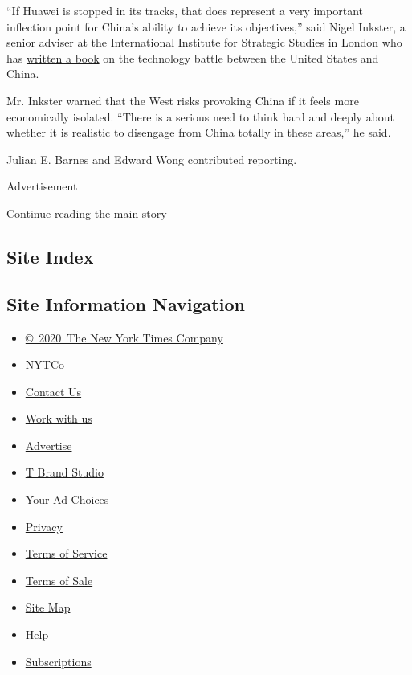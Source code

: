 ``If Huawei is stopped in its tracks, that does represent a very
important inflection point for China's ability to achieve its
objectives,'' said Nigel Inkster, a senior adviser at the International
Institute for Strategic Studies in London who has
\href{https://www.hurstpublishers.com/book/the-great-decoupling/}{written
a book} on the technology battle between the United States and China.

Mr. Inkster warned that the West risks provoking China if it feels more
economically isolated. ``There is a serious need to think hard and
deeply about whether it is realistic to disengage from China totally in
these areas,'' he said.

Julian E. Barnes and Edward Wong contributed reporting.

Advertisement

\protect\hyperlink{after-bottom}{Continue reading the main story}

\hypertarget{site-index}{%
\subsection{Site Index}\label{site-index}}

\hypertarget{site-information-navigation}{%
\subsection{Site Information
Navigation}\label{site-information-navigation}}

\begin{itemize}
\tightlist
\item
  \href{https://help.nytimes.com/hc/en-us/articles/115014792127-Copyright-notice}{©~2020~The
  New York Times Company}
\end{itemize}

\begin{itemize}
\tightlist
\item
  \href{https://www.nytco.com/}{NYTCo}
\item
  \href{https://help.nytimes.com/hc/en-us/articles/115015385887-Contact-Us}{Contact
  Us}
\item
  \href{https://www.nytco.com/careers/}{Work with us}
\item
  \href{https://nytmediakit.com/}{Advertise}
\item
  \href{http://www.tbrandstudio.com/}{T Brand Studio}
\item
  \href{https://www.nytimes.com/privacy/cookie-policy\#how-do-i-manage-trackers}{Your
  Ad Choices}
\item
  \href{https://www.nytimes.com/privacy}{Privacy}
\item
  \href{https://help.nytimes.com/hc/en-us/articles/115014893428-Terms-of-service}{Terms
  of Service}
\item
  \href{https://help.nytimes.com/hc/en-us/articles/115014893968-Terms-of-sale}{Terms
  of Sale}
\item
  \href{https://spiderbites.nytimes.com}{Site Map}
\item
  \href{https://help.nytimes.com/hc/en-us}{Help}
\item
  \href{https://www.nytimes.com/subscription?campaignId=37WXW}{Subscriptions}
\end{itemize}
